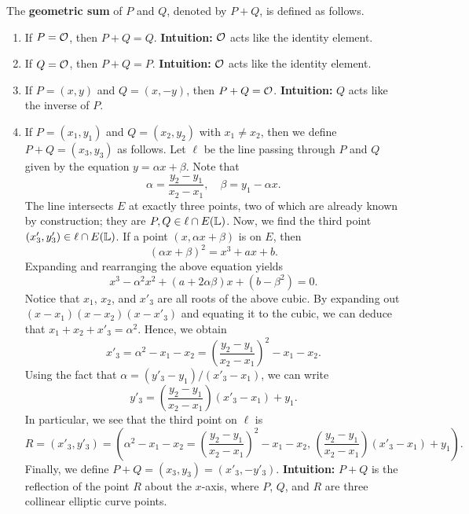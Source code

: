 \begin{defn}
    The {\bf geometric sum} of $P$ and $Q$, denoted by $P + Q$, is defined 
    as follows. 
    \begin{enumerate}[(1)]
        \item If $P = {\cal O}$, then $P + Q = Q$. \textbf{Intuition:} ${\cal O}$ 
        acts like the identity element. 
        \item If $Q = {\cal O}$, then $P + Q = P$. \textbf{Intuition:} ${\cal O}$ 
        acts like the identity element. 
        \item If $P = (x, y)$ and $Q = (x, -y)$, then $P + Q = {\cal O}$.
        \textbf{Intuition:} $Q$ acts like the inverse of $P$. 
        \item If $P = (x_1, y_1)$ and $Q = (x_2, y_2)$ with $x_1 \neq x_2$, then 
        we define $P + Q = (x_3, y_3)$ as follows. Let $\ell$ be the line 
        passing through $P$ and $Q$ given by the equation $y = \alpha x + \beta$. 
        Note that 
        \[ \alpha = \frac{y_2 - y_1}{x_2 - x_1}, \quad \beta = y_1 - \alpha x. \] 
        The line intersects $E$ at exactly three points, two of which are 
        already known by construction; they are $P, Q \in \ell \cap E(\mathbb{L})$. 
        Now, we find the third point $(x'_3, y'_3) \in \ell \cap E(\mathbb{L})$. 
        If a point $(x, \alpha x + \beta)$ is on $E$, then 
        \[ (\alpha x + \beta)^2 = x^3 + ax + b. \] 
        Expanding and rearranging the above equation yields 
        \[ x^3 - \alpha^2 x^2 + (a + 2\alpha\beta)x + (b - \beta^2) = 0. \]
        Notice that $x_1$, $x_2$, and $x'_3$ are all roots of the above 
        cubic. By expanding out $(x - x_1)(x - x_2)(x - x'_3)$ and equating 
        it to the cubic, we can deduce that $x_1 + x_2 + x'_3 = \alpha^2$. 
        Hence, we obtain 
        \[ x'_3 = \alpha^2 - x_1 - x_2 = \left( \frac{y_2 - y_1}{x_2 - x_1} \right)^{\!2} - x_1 - x_2. \] 
        Using the fact that $\alpha = (y'_3 - y_1)/(x'_3 - x_1)$, we can write 
        \[ y'_3 = \left( \frac{y_2 - y_1}{x_2 - x_1} \right)(x'_3 - x_1) + y_1. \] 
        In particular, we see that the third point on $\ell$ is 
        \[ R = (x'_3, y'_3) = \left( \alpha^2 - x_1 - x_2 = 
        \left( \frac{y_2 - y_1}{x_2 - x_1} \right)^{\!2} - x_1 - x_2,\,
        \left( \frac{y_2 - y_1}{x_2 - x_1} \right)(x'_3 - x_1) + y_1 \right). \] 
        Finally, we define $P + Q = (x_3, y_3) = (x'_3, -y'_3)$. 
        \textbf{Intuition:} $P + Q$ is the reflection of the point $R$ 
        about the $x$-axis, where $P$, $Q$, and $R$ are three collinear 
        elliptic curve points. 

\end{enumerate}
\end{defn}
